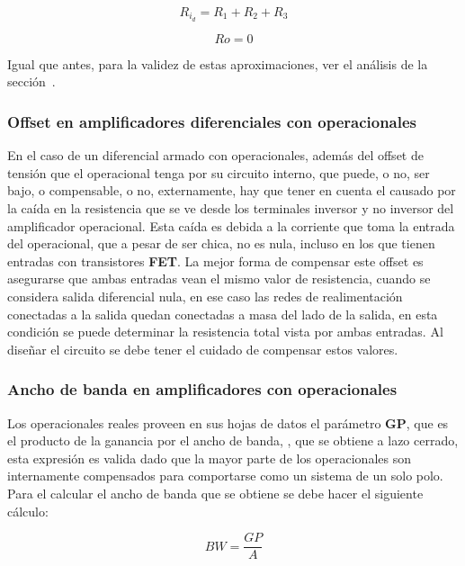 \begin{equation}
\boxed{R_{i_{d}} = R_{1} + R_{2} + R_{3}}
\end{equation}


\begin{equation}
\boxed{R{o} = 0}
\end{equation}

Igual que antes, para la validez de estas aproximaciones, ver el análisis de la sección~.


\subsubsection{Offset en amplificadores diferenciales con operacionales}

En el caso de un diferencial armado con operacionales, además del offset de tensión que el operacional tenga por su circuito interno, que puede, o no, ser bajo, o compensable, o no, externamente, hay que tener en cuenta el causado por la caída en la resistencia que se ve desde los terminales inversor y no inversor del amplificador operacional. Esta caída es debida a la corriente que toma la entrada del operacional, que a pesar de ser chica, no es nula, incluso en los que tienen entradas con transistores \textbf{FET}. La mejor forma de compensar este offset es asegurarse que ambas entradas vean el mismo valor de resistencia, cuando se considera salida diferencial nula, en ese caso las redes de realimentación conectadas a la salida quedan conectadas a masa del lado de la salida, en esta condición se puede determinar la resistencia total vista por ambas entradas. Al diseñar el circuito se debe tener el cuidado de compensar estos valores.


\subsubsection{Ancho de banda en amplificadores con operacionales}

Los operacionales reales proveen en sus hojas de datos el parámetro \textbf{GP}, que es el producto de la ganancia  por el ancho de banda, , que se obtiene a lazo cerrado, esta expresión es valida dado que la mayor parte de los operacionales son internamente compensados para comportarse como un sistema de un solo polo. Para el calcular el ancho de banda que se obtiene se debe hacer el siguiente cálculo:

\begin{equation}
\boxed{BW = \frac{GP}{A}}
\end{equation}



